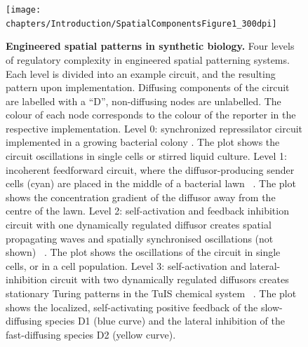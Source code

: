 \begin{figure}[H]
    \centering
    \texttt{[image: chapters/Introduction/SpatialComponentsFigure1\_300dpi]}
    \caption[\textbf{Engineered spatial patterns in synthetic biology.}]{\textbf{Engineered spatial patterns in synthetic biology.} Four levels of regulatory complexity in engineered spatial patterning systems. Each level is divided into an example circuit, and the resulting pattern upon implementation. Diffusing components of the circuit are labelled with a “D”, non-diffusing nodes are unlabelled. The colour of each node corresponds to the colour of the reporter in the respective implementation. Level 0: synchronized repressilator circuit implemented in a growing bacterial colony \parencite{Potvin-Trottier2016}. The plot shows the circuit oscillations in single cells or stirred liquid culture. Level 1: incoherent feedforward circuit, where the diffusor-producing sender cells (cyan) are placed in the middle of a bacterial lawn ~\parencite{Basu2005}. The plot shows the concentration gradient of the diffusor away from the centre of the lawn. Level 2: self-activation and feedback inhibition circuit with one dynamically regulated diffusor creates spatial propagating waves and spatially synchronised oscillations (not shown) ~\parencite{Danino2010}. The plot shows the oscillations of the circuit in single cells, or in a cell population. Level 3: self-activation and lateral-inhibition circuit with two dynamically regulated diffusors creates stationary Turing patterns in the TuIS chemical system ~\parencite{Horvath}. The plot shows the localized, self-activating positive feedback of the slow-diffusing species D1 (blue curve) and the lateral inhibition of the fast-diffusing species D2 (yellow curve).} %
    \label{fig:engineered_patterns}
\end{figure}

